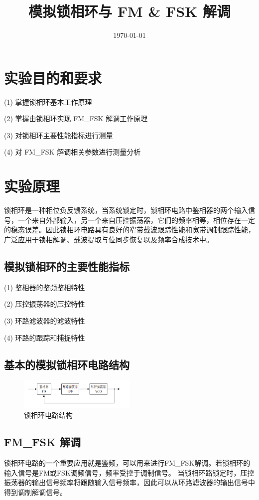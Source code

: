 \documentclass{../source/Experiment}
\title{模拟锁相环与 FM \& FSK 解调}
\date{\today}
\begin{document}
\makecover
\makeheader
    \section{实验目的和要求}
    (1) 掌握锁相环基本工作原理

    (2) 掌握由锁相环实现 FM\_FSK 解调工作原理

    (3) 对锁相环主要性能指标进行测量

    (4) 对 FM\_FSK 解调相关参数进行测量分析


    \section{实验原理}
    锁相环是一种相位负反馈系统，当系统锁定时，锁相环电路中鉴相器的两个输入信号，一个来自外部输入，另一个来自压控振荡器，它们的频率相等，相位存在一定的稳态误差。因此锁相环电路具有良好的窄带载波跟踪性能和宽带调制跟踪性能，广泛应用于锁相解调、载波提取与位同步恢复以及频率合成技术中。

        \subsection{模拟锁相环的主要性能指标}

        (1) 鉴相器的鉴频鉴相特性

        (2) 压控振荡器的压控特性

        (3) 环路滤波器的滤波特性

        (4) 环路的跟踪和捕捉特性
        \subsection{基本的模拟锁相环电路结构}
        \begin{figure}[H]
            \centering
            \includegraphics[width = 0.5\textwidth]{lab4/2.png}
            \caption{锁相环电路结构}    
        \end{figure}


        
        \subsection{FM\_FSK 解调}
        锁相环电路的一个重要应用就是鉴频，可以用来进行FM\_FSK解调。若锁相环的输入信号是FM或FSK调频信号，频率受控于调制信号。
        当锁相环路锁定时，压控振荡器的输出信号频率将跟随输入信号频率，因此可以从环路滤波器的输出信号中得到调制解调信号。
\end{document}
